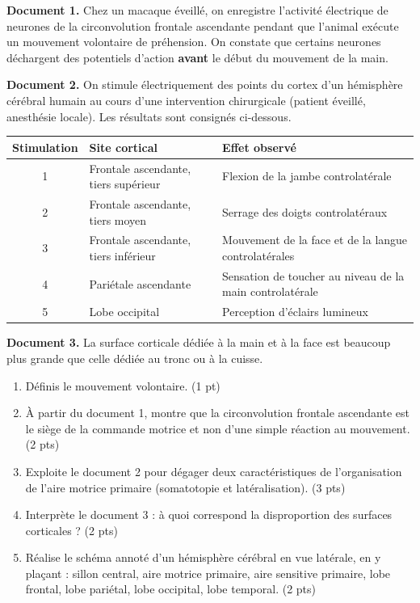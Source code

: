 \documentclass[11pt]{article}
\begin{document}
\begin{exercice}
\textbf{Document 1.} Chez un macaque éveillé, on enregistre l'activité électrique de neurones de la circonvolution frontale ascendante pendant que l'animal exécute un mouvement volontaire de préhension. On constate que certains neurones déchargent des potentiels d'action \textbf{avant} le début du mouvement de la main.

\textbf{Document 2.} On stimule électriquement des points du cortex d'un hémisphère cérébral humain au cours d'une intervention chirurgicale (patient éveillé, anesthésie locale). Les résultats sont consignés ci-dessous.

\begin{center}
\begin{tabularx}{\linewidth}{|c|X|X|}
\hline
\rowcolor{popblueL} Stimulation & Site cortical & Effet observé \\
\hline
1 & Frontale ascendante, tiers supérieur & Flexion de la jambe controlatérale \\
\hline
2 & Frontale ascendante, tiers moyen & Serrage des doigts controlatéraux \\
\hline
3 & Frontale ascendante, tiers inférieur & Mouvement de la face et de la langue controlatérales \\
\hline
4 & Pariétale ascendante & Sensation de toucher au niveau de la main controlatérale \\
\hline
5 & Lobe occipital & Perception d'éclairs lumineux \\
\hline
\end{tabularx}
\end{center}

\textbf{Document 3.} La surface corticale dédiée à la main et à la face est beaucoup plus grande que celle dédiée au tronc ou à la cuisse.

\begin{enumerate}
\item Définis le mouvement volontaire. (1 pt)
\item À partir du document 1, montre que la circonvolution frontale ascendante est le siège de la commande motrice et non d'une simple réaction au mouvement. (2 pts)
\item Exploite le document 2 pour dégager deux caractéristiques de l'organisation de l'aire motrice primaire (somatotopie et latéralisation). (3 pts)
\item Interprète le document 3 : à quoi correspond la disproportion des surfaces corticales ? (2 pts)
\item Réalise le schéma annoté d'un hémisphère cérébral en vue latérale, en y plaçant : sillon central, aire motrice primaire, aire sensitive primaire, lobe frontal, lobe pariétal, lobe occipital, lobe temporal. (2 pts)
\end{enumerate}
\end{exercice}
\end{document}

